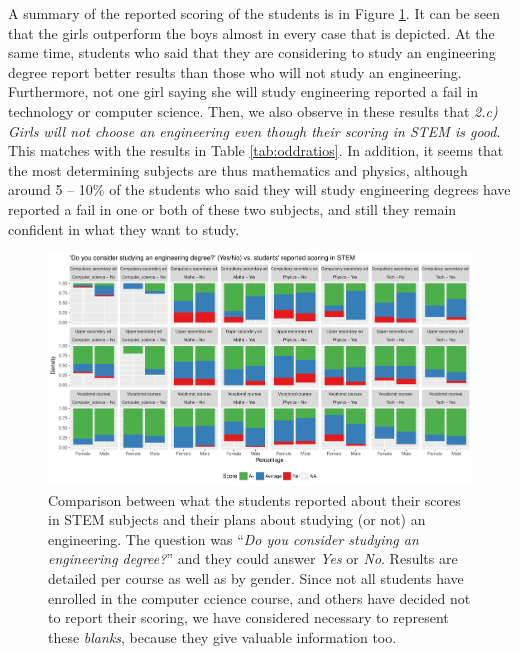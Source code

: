 \documentclass[journal,transmag]{IEEEtran}
\begin{document}
A summary of the reported scoring of the students is in Figure \ref{fig:futurevsscore}. It can be seen that the girls outperform the boys almost in every case that is depicted. At the same time, students who said that they are considering to study an engineering degree report better results than those who will not study an engineering. Furthermore, not one girl saying she will study engineering reported a fail in technology or computer science. Then, we also observe in these results that \textit{2.c) Girls will not choose an engineering even though their scoring in STEM is good}. This matches with the results in Table \ref{tab:oddratios}. In addition, it seems that the most determining subjects are thus mathematics and physics, although around 5 -- 10\% of the students who said they will study engineering degrees have reported a fail in one or both of these two subjects, and still they remain confident in what they want to study.

\begin{figure}
	\centering
	\includegraphics[width=1\textwidth]{img/future_vs_scoringSTEM.pdf}
	\caption{Comparison between what the students reported about their scores in STEM subjects and their plans about studying (or not) an engineering. The question was ``\textit{Do you consider studying an engineering degree?}'' and they could answer \textit{Yes} or \textit{No}. Results are detailed per course as well as by gender. Since not all students have enrolled in the computer ccience course, and others have decided not to report their scoring, we have considered necessary to represent these \textit{blanks}, because they give valuable information too.}
	\label{fig:futurevsscore}
\end{figure}
\end{document}
